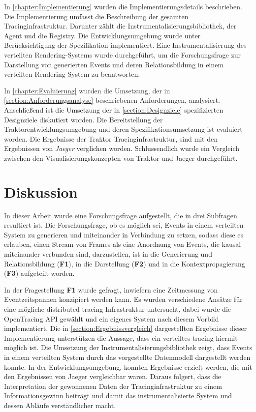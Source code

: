 In \cref{chapter:Implementierung} wurden die Implementierungsdetails beschrieben. Die Implementierung umfasst die Beschreibung der gesamten Tracinginfrastruktur. Darunter zählt die Instrumentalisierungsbibliothek, der Agent und die Registry. Die Entwicklungsumgebung wurde unter Berücksichtigung der Spezifikation implementiert. Eine Instrumentalisierung des verteilten Rendering-Systems wurde durchgeführt, um die Forschungsfrage zur Darstellung von generierten Events und deren Relationsbildung in einem verteilten Rendering-System zu beantworten.

In \cref{chapter:Evaluierung} wurden die Umsetzung, der in \cref{section:Anforderungsanalyse} beschriebenen Anforderungen, analysiert. Anschließend ist die Umsetzung der in \cref{section:Designziele} spezifizierten Designziele diskutiert worden. Die Bereitstellung der Traktorentwicklungsumgebung und deren Spezifikationsumsetzung ist evaluiert worden. Die Ergebnisse der Traktor Tracinginfrastruktur, sind mit den Ergebnissen von \emph{Jaeger} verglichen worden. Schlussendlich wurde ein Vergleich zwischen den Visualisierungskonzepten von Traktor und Jaeger durchgeführt.

\section{Diskussion}
\label{Diskussion}

In dieser Arbeit wurde eine Forschungsfrage aufgestellt, die in drei Subfragen resultiert ist. Die Forschungsfrage, ob es möglich sei, Events in einem verteilten System zu generieren und miteinander in Verbindung zu setzen, sodass diese es erlauben, einen Stream von Frames als eine Anordnung von Events, die kausal miteinander verbunden sind, darzustellen, ist in die Generierung und Relationsbildung (\textbf{F1}), in die Darstellung (\textbf{F2}) und in die Kontextpropagierung (\textbf{F3}) aufgeteilt worden.


In der Fragestellung \textbf{F1} wurde gefragt, inwiefern eine Zeitmessung von Eventzeitspannen konzipiert werden kann. Es wurden verschiedene Ansätze für eine mögliche distributed tracing Infrastruktur untersucht, dabei wurde die OpenTracing API gewählt und ein eigenes System nach diesem Vorbild implementiert. Die in \cref{section:Ergebnissvergleich} dargestellten Ergebnisse dieser Implementierung unterstützen die Aussage, dass ein verteiltes tracing hiermit möglich ist. Die Umsetzung der Instrumentalisierungsbibliothek zeigt, dass Events in einem verteilten System durch das vorgestellte Datenmodell dargestellt werden konnte. In der Entwicklungsumgebung, konnten Ergebnisse erzielt werden, die mit den Ergebnissen von Jaeger vergleichbar waren. Daraus folgert, dass die Interpretation der gewonnenen Daten der Tracinginfrastruktur zu einem Informationsgewinn beiträgt und damit das instrumentalisierte System und dessen Abläufe verständlicher macht.

